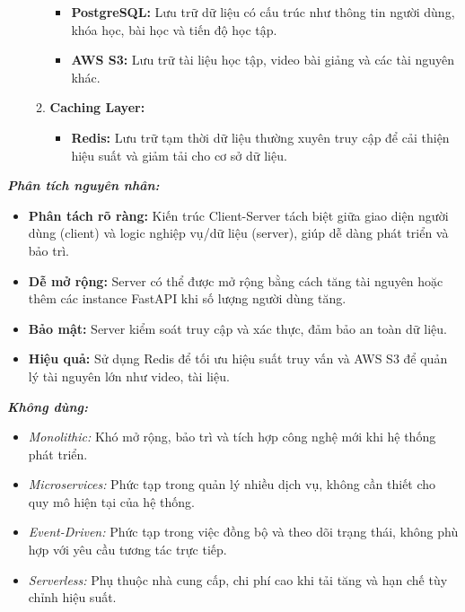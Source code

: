 \begin{enumerate}
\begin{enumerate}
\begin{itemize}
            \item \textbf{PostgreSQL:} Lưu trữ dữ liệu có cấu trúc như thông tin người dùng, khóa học, bài học và tiến độ học tập.
            \item \textbf{AWS S3:} Lưu trữ tài liệu học tập, video bài giảng và các tài nguyên khác.
        \end{itemize}
        \item \textbf{Caching Layer:}
        \begin{itemize}
            \item \textbf{Redis:} Lưu trữ tạm thời dữ liệu thường xuyên truy cập để cải thiện hiệu suất và giảm tải cho cơ sở dữ liệu.
        \end{itemize}
    \end{enumerate}
\end{enumerate}

\textbf{\textit{Phân tích nguyên nhân:}}
\begin{itemize}
    \item \textbf{Phân tách rõ ràng:} Kiến trúc Client-Server tách biệt giữa giao diện người dùng (client) và logic nghiệp vụ/dữ liệu (server), giúp dễ dàng phát triển và bảo trì.
    \item \textbf{Dễ mở rộng:} Server có thể được mở rộng bằng cách tăng tài nguyên hoặc thêm các instance FastAPI khi số lượng người dùng tăng.
    \item \textbf{Bảo mật:} Server kiểm soát truy cập và xác thực, đảm bảo an toàn dữ liệu.
    \item \textbf{Hiệu quả:} Sử dụng Redis để tối ưu hiệu suất truy vấn và AWS S3 để quản lý tài nguyên lớn như video, tài liệu.
\end{itemize}

\textbf{\textit{Không dùng:}}
\begin{itemize}
    \item \textit{Monolithic:} Khó mở rộng, bảo trì và tích hợp công nghệ mới khi hệ thống phát triển.
    \item \textit{Microservices:} Phức tạp trong quản lý nhiều dịch vụ, không cần thiết cho quy mô hiện tại của hệ thống.
    \item \textit{Event-Driven:} Phức tạp trong việc đồng bộ và theo dõi trạng thái, không phù hợp với yêu cầu tương tác trực tiếp.
    \item \textit{Serverless:} Phụ thuộc nhà cung cấp, chi phí cao khi tải tăng và hạn chế tùy chỉnh hiệu suất.
\end{itemize}

